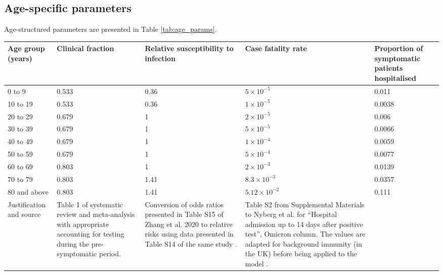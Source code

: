 \subsection{Age-specific parameters}
Age-structured parameters are presented in Table \ref{tab:age_params}.

\begin{table}
    \begin{threeparttable}
    \begin{tabularx}{\textwidth}{| X | X | X | X | X |}
        \hline
        \textbf{Age group} (years) & \textbf{Clinical fraction} \tnote{a} & 
        \textbf{Relative susceptibility to infection} & \textbf{Case fatality rate} & 
        \textbf{Proportion of symptomatic patients hospitalised} \\
        \hline
        0 to 9   & 0.533 & 0.36 & $5\times10^{-5}$   & 0.011 \\
        \hline
        10 to 19 & 0.533 & 0.36 & $1\times10^{-5}$   & 0.0038 \\
        \hline
        20 to 29 & 0.679 & 1    & $2\times10^{-5}$   & 0.006 \\
        \hline
        30 to 39 & 0.679 & 1    & $5\times10^{-5}$   & 0.0066 \\
        \hline
        40 to 49 & 0.679 & 1    & $1\times10^{-4}$   & 0.0059 \\
        \hline
        50 to 59 & 0.679 & 1    & $5\times10^{-4}$   & 0.0077 \\
        \hline
        60 to 69 & 0.803 & 1    & $2\times10^{-3}$   & 0.0139 \\
        \hline
        70 to 79 & 0.803 & 1.41 & $8.3\times10^{-3}$ \tnote{b} & 0.0357 \tnote{b} \\
        \hline
        80 and above & 0.803 & 1.41 & $5.12\times10^{-2}$ \tnote{b} & 0.111 \tnote{b} \\
        \hline
        Justification and source & 
        Table 1 of systematic review and meta-analysis 
        with appropriate accounting for testing during the pre-symptomatic period\cite{sah-2021}. & 
        Conversion of odds ratios presented in Table S15 
        of Zhang et al. 2020 to relative risks 
        using data presented in Table S14 of the same study \cite{zhang-2020-a}. &
        Table S2 from Supplemental Materials to Nyberg et al. 
        for ``Hospital admission up to 14 days after positive test'', Omicron column.
        The values are adapted for background immunity (in the UK) before being applied to the
        model \cite{nyberg-2022}. &

\end{tabularx}
\end{threeparttable}
\end{table}
